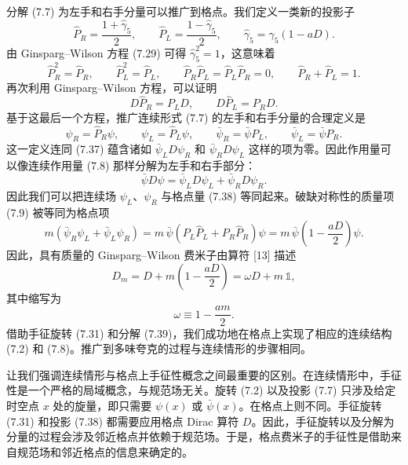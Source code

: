 分解 (7.7) 为左手和右手分量可以推广到格点。我们定义一类新的投影子
\begin{equation}
  \hat P_R = \frac{1+\hat\gamma_5}{2}, \qquad
  \hat P_L = \frac{1-\hat\gamma_5}{2}, \qquad
  \hat\gamma_5 = \gamma_5(1 - aD) .
\end{equation}
由 Ginsparg--Wilson 方程 (7.29) 可得 $\hat\gamma_5^2 = 1$，这意味着
\begin{equation}
  \hat P_R^2 = \hat P_R, \qquad
  \hat P_L^2 = \hat P_L, \qquad
  \hat P_R\hat P_L = \hat P_L\hat P_R = 0, \qquad
  \hat P_R + \hat P_L = 1 .
\end{equation}
再次利用 Ginsparg--Wilson 方程，可以证明
\begin{equation}
  D\hat P_R = P_L D, \qquad
  D\hat P_L = P_R D .
\end{equation}
基于这最后一个方程，推广连续形式 (7.7) 的左手和右手分量的合理定义是
\begin{equation}
  \psi_R = \hat P_R\psi, \qquad \psi_L = \hat P_L\psi,
  \qquad
  \bar\psi_R = \bar\psi P_L, \qquad \bar\psi_L = \bar\psi P_R .
\end{equation}
这一定义连同 (7.37) 蕴含诸如 $\bar\psi_L D\psi_R$ 和 $\bar\psi_R D\psi_L$ 这样的项为零。因此作用量可以像连续作用量 (7.8) 那样分解为左手和右手部分：
\begin{equation}
  \bar\psi D\psi = \bar\psi_L D\psi_L + \bar\psi_R D\psi_R .
\end{equation}
因此我们可以把连续场 $\psi_L$、$\psi_R$ 与格点量 (7.38) 等同起来。破缺对称性的质量项 (7.9) 被等同为格点项
\begin{equation}
  m\left(\bar\psi_R\psi_L + \bar\psi_L\psi_R\right)
  = m\,\bar\psi\left(P_L\hat P_L + P_R\hat P_R\right)\psi
  = m\,\bar\psi\left(1-\frac{aD}{2}\right)\psi .
\end{equation}
因此，具有质量的 Ginsparg--Wilson 费米子由算符 [13] 描述
\begin{equation}
  D_m = D + m\left(1-\frac{aD}{2}\right) = \omega D + m\,\mathbb{1},
\end{equation}
其中缩写为
\begin{equation}
  \omega \equiv 1-\frac{am}{2} .
\end{equation}
借助手征旋转 (7.31) 和分解 (7.39)，我们成功地在格点上实现了相应的连续结构 (7.2) 和 (7.8)。推广到多味夸克的过程与连续情形的步骤相同。

让我们强调连续情形与格点上手征性概念之间最重要的区别。在连续情形中，手征性是一个严格的局域概念，与规范场无关。旋转 (7.2) 以及投影 (7.7) 只涉及给定时空点 $x$ 处的旋量，即只需要 $\psi(x)$ 或 $\bar\psi(x)$。在格点上则不同。手征旋转 (7.31) 和投影 (7.38) 都需要应用格点 Dirac 算符 $D$。因此，手征旋转以及分解为分量的过程会涉及邻近格点并依赖于规范场。于是，格点费米子的手征性是借助来自规范场和邻近格点的信息来确定的。

